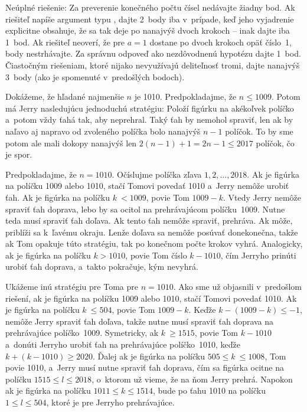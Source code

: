 {Neúplné riešenie:
\* Za preverenie konečného počtu čísel nedávajte žiadny bod.
\* Ak riešiteľ napíše argument typu , dajte 2~body iba v~prípade, keď jeho vyjadrenie
explicitne obsahuje, že sa tak deje po nanajvýš dvoch krokoch --
inak dajte iba 1~bod.
\* Ak riešiteľ neoverí, že pre $a=1$ dostane po dvoch krokoch opäť číslo~1, body nestrhávajte.
\* Za správnu odpoveď ako nezdôvodnenú hypotézu dajte 1~bod.\nopagebreak
\* Čiastočným riešeniam, ktoré nijako nevyužívajú deliteľnosť
tromi, dajte nanajvýš 3~body (ako je spomenuté v~predošlých bodoch).
\endpetit
}

{%
Dokážeme, že hľadané najmenšie $n$ je 1010. Predpokladajme,
že $n \le 1009$. Potom má Jerry nasledujúcu jednoduchú stratégiu:
Položí figúrku na akékoľvek políčko a~potom vždy ťahá tak, aby
neprehral. Taký ťah by nemohol spraviť, len ak by naľavo
aj napravo od zvoleného políčka bolo nanajvýš $n-1$ políčok. To by sme potom ale mali
dokopy nanajvýš len $2 (n-1)+1 = 2n-1 \le 2017$ políčok, čo je spor.

Predpokladajme, že $n = 1010$.
Očíslujme políčka zľava $1,2, \ldots, 2018$. Ak je figúrka na políčku
1009 alebo 1010, stačí Tomovi povedať 1010 a~Jerry nemôže urobiť ťah. Ak je
figúrka na políčku $k~<1009$, povie Tom $1009-k$. Vtedy Jerry nemôže
spraviť ťah doprava, lebo by sa ocitol na prehrávajúcom políčku~1009. Nutne
teda musí spraviť ťah doľava. Ak tento ťah nemôže spraviť, prehráva. Ak
môže, priblíži sa k~ľavému okraju. Lenže doľava sa nemôže posúvať
donekonečna, takže ak Tom opakuje túto stratégiu, tak po konečnom počte
krokov vyhrá. Analogicky, ak je figúrka na políčku $k> 1010$, povie Tom
číslo $k-1010$, čím Jerryho prinúti urobiť ťah doprava, a~takto pokračuje,
kým nevyhrá.

\ineres
Ukážeme inú stratégiu pre Toma pre $n = 1010$. Ako sme už objasnili
v~predošlom riešení, ak je figúrka na políčku 1009 alebo 1010, stačí Tomovi
povedať 1010. Ak je figúrka na políčku $k~\le 504$, povie Tom
$1009-k$. Keďže $k- {(1009-k)} \le {-1}$, nemôže Jerry spraviť ťah doľava,
takže nutne musí spraviť ťah doprava na prehrávajúce políčko~1009.
Symetricky, ak $k~\ge 1515$, povie Tom $k-1010$ a~donúti Jerryho
urobiť ťah na prehrávajúce políčko~1010, keďže $k+(k-1010) \ge 2020$. Ďalej
ak je figúrka na políčku $505 \le k~\le 1008$, Tom povie 1010,
a~Jerry musí nutne spraviť ťah doprava, čím sa figúrka ocitne na políčku $1515
\le l \le 2018$, o~ktorom už vieme, že na ňom Jerry prehrá. Napokon
ak je figúrka na políčku $1011 \le k\le 1514$, bude po ťahu 1010
na políčku $1 \le l \le 504$, ktoré je pre Jerryho prehrávajúce.

}
